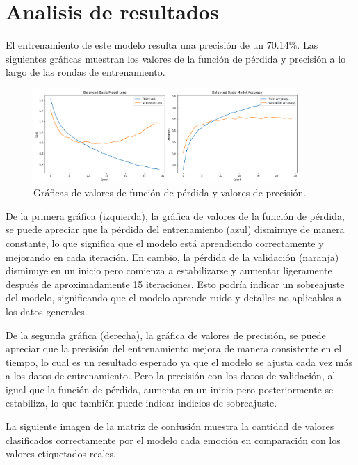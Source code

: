 \documentclass[12pt]{report} %
\begin{document}
\section{Analisis de resultados}

El entrenamiento de este modelo resulta una precisión de un 70.14\%. Las siguientes gráficas muestran los valores de la función de pérdida y precisión a lo largo de las rondas de entrenamiento.

\begin{figure}[H]
	\centering
	\includegraphics[width=0.9\textwidth]{graficasEntrenamiento.png}
	\caption{Gráficas de valores de función de pérdida y valores de precisión.}
	\label{fig:imagen31}
\end{figure}

De la primera gráfica (izquierda), la gráfica de valores de la función de pérdida, se puede apreciar que la pérdida del entrenamiento (azul) disminuye de manera constante, lo que significa que el modelo está aprendiendo correctamente y mejorando en cada iteración. En cambio, la pérdida de la validación (naranja) disminuye en un inicio pero comienza a estabilizarse y aumentar ligeramente después de aproximadamente 15 iteraciones. Esto podría indicar un sobreajuste del modelo, significando que el modelo aprende ruido y detalles no aplicables a los datos generales.

De la segunda gráfica (derecha), la gráfica de valores de precisión, se puede apreciar que la precisión del entrenamiento mejora de manera consistente en el tiempo, lo cual es un resultado esperado ya que el modelo se ajusta cada vez más a los datos de entrenamiento. Pero la precisión con los datos de validación, al igual que la función de pérdida, aumenta en un inicio pero posteriormente se estabiliza, lo que también puede indicar indicios de sobreajuste.

La siguiente imagen de la matriz de confusión muestra la cantidad de valores clasificados correctamente por el modelo cada emoción en comparación con los valores etiquetados reales.
\end{document}
